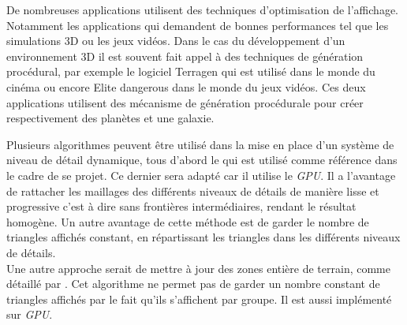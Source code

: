 \documentclass[12pt]{report}
\begin{document}

De nombreuses applications utilisent des techniques d'optimisation de
l'affichage. Notamment les applications qui demandent de bonnes
performances tel que les simulations 3D ou les jeux vidéos.
Dans le cas du développement d'un environnement 3D il est souvent fait
appel à des techniques de génération procédural, par exemple le logiciel
Terragen qui est utilisé dans le monde du cinéma ou encore Elite
dangerous dans le monde du jeux vidéos.  Ces deux applications utilisent
des mécanisme de génération procédurale pour créer respectivement des
planètes et une galaxie.

Plusieurs algorithmes peuvent être utilisé dans la mise en place d'un
système de niveau de détail dynamique, tous d'abord le \cite{CDLOD} qui
est utilisé comme référence dans le cadre de se projet. Ce dernier sera
adapté car il utilise le \emph{GPU}. Il a l'avantage de rattacher les
maillages des différents niveaux de détails de manière lisse et
progressive c'est à dire sans frontières intermédiaires, rendant le
résultat homogène.  Un autre avantage de cette méthode est de garder le
nombre de triangles affichés constant, en répartissant les triangles
dans les différents niveaux de détails.\\
Une autre approche serait de mettre à jour des zones entière de terrain,
comme détaillé par \cite{MassiveTerrain}. Cet algorithme ne permet pas
de garder un nombre constant de triangles affichés par le fait qu'ils
s'affichent par groupe. Il est aussi implémenté sur \emph{GPU}.\\



\newpage
\end{document}

